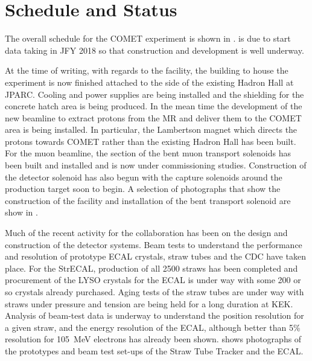 
\section{Schedule and Status}
\FigSchedule
The overall schedule for the COMET experiment is shown in .
\phaseI is due to start data taking in \ac{JFY} 2018 so that construction and development is well underway.

\FigStatusFacility
At the time of writing, with regards to the facility, the building to house the experiment is now finished attached to the side of the existing Hadron Hall at \ac{JPARC}.
Cooling and power supplies are being installed and the shielding for the concrete hatch area is being produced.
In the mean time the development of the new beamline to extract protons from the \ac{MR} and deliver them to the COMET area is being installed.
In particular, the Lambertson magnet which directs the protons towards COMET rather than the existing Hadron Hall has been built.
For the muon beamline, the \phaseI section of the bent muon transport solenoids has been built and installed and is now under commissioning studies.
Construction of the detector solenoid has also begun with the capture solenoids around the production target soon to begin.
A selection of photographs that show the construction of the facility and installation of the bent transport solenoid are show in .

\FigStatusStrECAL
Much of the recent activity for the collaboration has been on the design and construction of the detector systems.
Beam tests to understand the performance and resolution of prototype ECAL crystals, straw tubes and the \ac{CDC} have taken place.
For the \ac{StrECAL}, production of all 2500 \phaseI straws has been completed and procurement of the \ac{LYSO} crystals for the ECAL is under way with some 200 or so crystals already purchased.
Aging tests of the straw tubes are under way with straws under pressure and tension are being held for a long duration at KEK.
Analysis of beam-test data is underway to understand the position resolution for a given straw, and the energy resolution of the ECAL, although better than 5\% resolution for 105~MeV electrons has already been shown.
 shows photographs of the prototypes and beam test set-ups of the Straw Tube Tracker and the ECAL.

